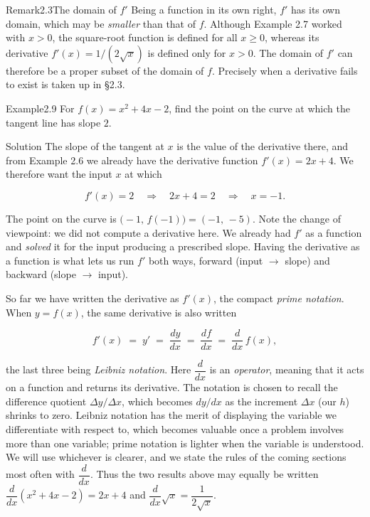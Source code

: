 \documentclass[a4paper,12pt,oneside]{memoir}
\begin{document}
\begin{envremark}{Remark}{2.3}{The domain of \(f'\)}
Being a function in its own right, \(f'\) has its own domain, which may be \emph{smaller} than that of \(f\). Although Example 2.7 worked with \(x > 0\), the square-root function is defined for all \(x \ge 0\), whereas its derivative \(f'(x) = 1/(2\sqrt{x})\) is defined only for \(x > 0\). The domain of \(f'\) can therefore be a proper subset of the domain of \(f\). Precisely when a derivative fails to exist is taken up in §2.3.
\end{envremark}
\begin{workedexample}
\begin{envexample}{Example}{2.9}{}
For \(f(x) = x^{2} + 4x - 2\), find the point on the curve at which the tangent line has slope \(2\).
\end{envexample}
\begin{envsolution}{Solution}{}{}
The slope of the tangent at \(x\) is the value of the derivative there, and from Example 2.6 we already have the derivative function \(f'(x) = 2x + 4\). We therefore want the input \(x\) at which

\[ f'(x) = 2 \quad\Longrightarrow\quad 2x + 4 = 2 \quad\Longrightarrow\quad x = -1. \]

The point on the curve is \(\bigl(-1,\, f(-1)\bigr) = (-1,\, -5)\). Note the change of viewpoint: we did not compute a derivative here. We already had \(f'\) as a function and \emph{solved} it for the input producing a prescribed slope. Having the derivative as a function is what lets us run \(f'\) both ways, forward (input \(\to\) slope) and backward (slope \(\to\) input).
\end{envsolution}
\end{workedexample}
So far we have written the derivative as \(f'(x)\), the compact \emph{prime notation}. When \(y = f(x)\), the same derivative is also written

\[ f'(x) \;=\; y' \;=\; \frac{dy}{dx} \;=\; \frac{df}{dx} \;=\; \frac{d}{dx}\,f(x), \]

the last three being \emph{Leibniz notation}. Here \(\dfrac{d}{dx}\) is an \emph{operator}, meaning that it acts on a function and returns its derivative. The notation is chosen to recall the difference quotient \(\Delta y / \Delta x\), which becomes \(dy/dx\) as the increment \(\Delta x\) (our \(h\)) shrinks to zero. Leibniz notation has the merit of displaying the variable we differentiate with respect to, which becomes valuable once a problem involves more than one variable; prime notation is lighter when the variable is understood. We will use whichever is clearer, and we state the rules of the coming sections most often with \(\dfrac{d}{dx}\). Thus the two results above may equally be written \(\dfrac{d}{dx}(x^{2} + 4x - 2) = 2x + 4\) and \(\dfrac{d}{dx}\sqrt{x} = \dfrac{1}{2\sqrt{x}}\).
\end{document}
